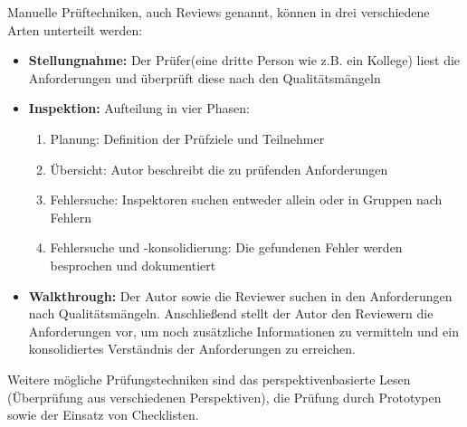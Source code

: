 Manuelle Prüftechniken, auch Reviews genannt, können in drei verschiedene Arten unterteilt werden:
\begin{itemize}
    \item \textbf{Stellungnahme:} Der Prüfer(eine dritte Person wie z.B. ein Kollege) liest die Anforderungen und überprüft diese nach den Qualitätsmängeln
    \item \textbf{Inspektion:} Aufteilung in vier Phasen:
    \begin{enumerate}
        \item Planung: Definition der Prüfziele und Teilnehmer
        \item Übersicht: Autor beschreibt die zu prüfenden Anforderungen
        \item Fehlersuche: Inspektoren suchen entweder allein oder in Gruppen nach Fehlern
        \item Fehlersuche und -konsolidierung: Die gefundenen Fehler werden besprochen und dokumentiert
    \end{enumerate}
    \item \textbf{Walkthrough:} Der Autor sowie die Reviewer suchen in den Anforderungen nach Qualitätsmängeln.
        Anschließend stellt der Autor den Reviewern die Anforderungen vor, um noch zusätzliche Informationen zu vermitteln und ein konsolidiertes Verständnis der Anforderungen zu erreichen.
\end{itemize}\autocite[vgl.][Seite 32ff]{Maulhardt.c}

Weitere mögliche Prüfungstechniken sind das perspektivenbasierte Lesen (Überprüfung aus verschiedenen Perspektiven), die Prüfung durch Prototypen sowie der Einsatz von Checklisten\autocite[vgl.][Seite 33]{Maulhardt.c}.




















